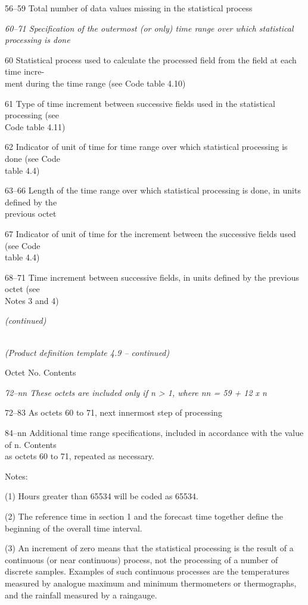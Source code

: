 56--59 Total number of data values missing in the statistical process

\emph{60--71 Specification of the outermost (or only) time range over which statistical}\\
\emph{processing is done}

60 Statistical process used to calculate the processed field from the field at each time incre-\\
ment during the time range (see Code table 4.10)

61 Type of time increment between successive fields used in the statistical processing (see\\
Code table 4.11)

62 Indicator of unit of time for time range over which statistical processing is done (see Code\\
table 4.4)

63--66 Length of the time range over which statistical processing is done, in units defined by the\\
previous octet

67 Indicator of unit of time for the increment between the successive fields used (see Code\\
table 4.4)

68--71 Time increment between successive fields, in units defined by the previous octet (see\\
Notes 3 and 4)

\emph{(continued)}

\emph{\\
(Product definition template 4.9 -- continued)}

Octet No. Contents

\emph{72--nn These octets are included only if n \textgreater{} 1, where nn = 59 + 12 x n}

72--83 As octets 60 to 71, next innermost step of processing

84--nn Additional time range specifications, included in accordance with the value of n. Contents\\
as octets 60 to 71, repeated as necessary.

Notes:

(1) Hours greater than 65534 will be coded as 65534.

(2) The reference time in section 1 and the forecast time together define the beginning of the overall time interval.

(3) An increment of zero means that the statistical processing is the result of a continuous (or near continuous) process, not the processing of a number of discrete samples. Examples of such continuous processes are the temperatures measured by analogue maximum and minimum thermometers or thermographs, and the rainfall measured by a raingauge.

